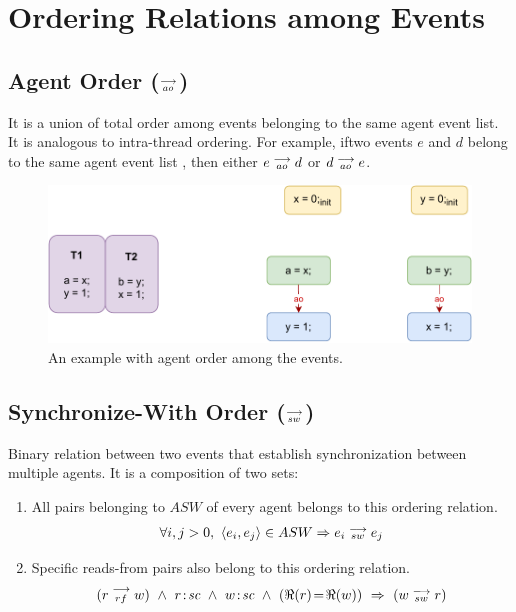\section{Ordering Relations among Events}
        
    \subsection{Agent Order ($\stackrel{\longrightarrow}{_{ao}}$)}
        It is a union of total order among events belonging to the same agent event list. It is analogous to intra-thread ordering. For example, iftwo events $e$ and $d$ belong to the same agent event list , then either $e\stackrel{\longrightarrow}{_{ao}}d$ or $d\stackrel{\longrightarrow}{_{ao}}e$. 
        
        \begin{figure}[H]
            \centering
            \includegraphics[scale=0.7]{ECMAScriptMemoryModel/AgentOrder.pdf}
            \caption{An example with agent order among the events.}
        \end{figure}
    
    \subsection{Synchronize-With Order ($\stackrel{\longrightarrow}{_{sw}} $)}
       Binary relation between two events that establish synchronization between multiple agents. It is a composition of two sets: 
        \begin{enumerate}
            \item All pairs belonging to $ASW$ of every agent belongs to this ordering relation. 
                \begin{align*}
                    \forall{i, j > 0}, \ \langle e_i, e_j \rangle \in ASW \Rightarrow{} e_i\stackrel{\longrightarrow}{_{sw}}e_j 
                \end{align*}
                    
            \item Specific reads-from pairs also belong to this ordering relation\footnotemark. 
                \begin{align*}
                    (\reln{r}{rf}{w}) \ \wedge \ \et{r}{sc} \ \wedge \ \et{w}{sc} \ \wedge \ (\Re(r)\!=\!\Re(w)) \ \Rightarrow{} \
                    (\reln{w}{sw}{r})
                \end{align*}
                    
        \end{enumerate}
        
